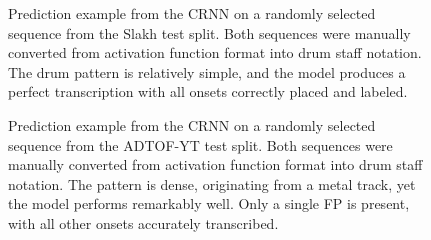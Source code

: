 \begin{figure}[H]
    \centering
    \caption{Prediction example from the \acrfull{CRNN} on a randomly selected sequence from the Slakh test split. Both sequences were manually converted from activation function format into drum staff notation. The drum pattern is relatively simple, and the model produces a perfect transcription with all onsets correctly placed and labeled.}
    \label{ArchitecturePredictionComparisonSlakhFigure}
\end{figure}

\begin{figure}[H]
    \centering
    \caption{Prediction example from the \acrfull{CRNN} on a randomly selected sequence from the ADTOF-YT test split. Both sequences were manually converted from activation function format into drum staff notation. The pattern is dense, originating from a metal track, yet the model performs remarkably well. Only a single \acrfull{FP} is present, with all other onsets accurately transcribed.}
    \label{ArchitecturePredictionComparisonADTOF-YTFigure}
\end{figure}

